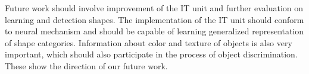 \documentclass[twocolumn]{article}
\begin{document}
Future work should involve improvement of the IT unit and further evaluation on learning and detection shapes.
The implementation of the IT unit should conform to neural mechanism
and should be capable of learning generalized representation of shape categories.
Information about color and texture of objects is also very important,
which should also participate in the process of object discrimination.
These show the direction of our future work.



\end{document}
